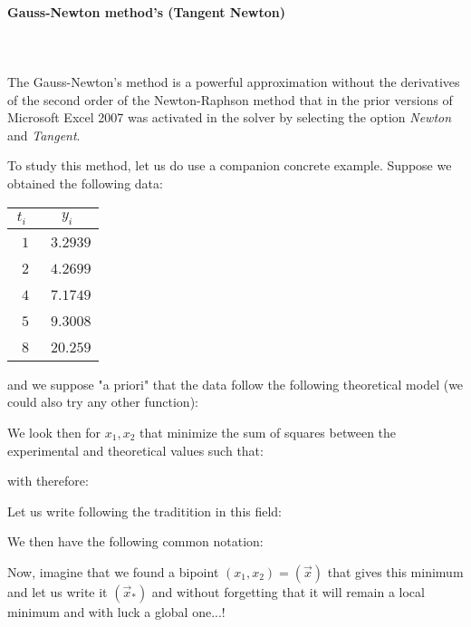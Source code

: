 	\paragraph{Gauss-Newton method's (Tangent Newton)}\mbox{}\\\\
	The Gauss-Newton's method is a powerful approximation without the derivatives of the second order of the Newton-Raphson method that in the prior versions of Microsoft Excel 2007 was activated in the solver by selecting the option \textit{Newton} and \textit{Tangent}.

	To study this method, let us do use a companion concrete example. Suppose we obtained the following data:
	\begin{table}[H]
		\begin{center}
				\begin{tabular}{|p{2cm}|p{2cm}|}
					\hline
					\multicolumn{1}{c}{\cellcolor{black!30}$t_i$} & 
	  \multicolumn{1}{c}{\cellcolor{black!30}$y_i$}  \\ \hline
					\centering\arraybackslash\ $1$ & \centering\arraybackslash\ $3.2939$ \\ \hline	
					\centering\arraybackslash\ $2$ & \centering\arraybackslash\ $4.2699$ \\ \hline	
					\centering\arraybackslash\ $4$ & \centering\arraybackslash\ $7.1749$ \\ \hline	
					\centering\arraybackslash\ $5$ & \centering\arraybackslash\ $9.3008$ \\ \hline	
					\centering\arraybackslash\ $8$ & \centering\arraybackslash\ $20.259$ \\ \hline	
				\end{tabular}
		\end{center}
	\end{table}
	and we suppose "a priori" that the data follow the following theoretical model (we could also try any other function):
	 
	We look then for $x_1,x_2$ that minimize the sum of squares between the experimental and theoretical values such that:
	
	with therefore:
	
	Let us write following the traditition in this field:
	
	We then have the following common notation:
	
	Now, imagine that we found a bipoint $(x_1,x_2)=(\vec{x})$ that gives this minimum and let us write it $(\vec{x}_{*})$ and without forgetting that it will remain a local minimum and with luck a global one...! 

